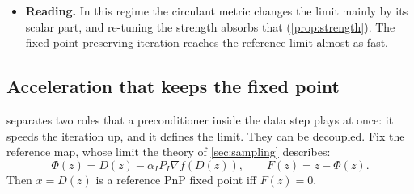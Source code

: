 \documentclass[11pt]{article}
\theoremstyle{definition}
\theoremstyle{remark}
\newcommand{\norm}[1]{\lVert #1\rVert}
\begin{document}
\begin{itemize}
  \begin{itemize}
  \item Per-set scalars: $\bar q/\alpha_I=1.77$ predicts $\lambda=2.2\cdot10^{-4}$ (grid best $2.5\cdot10^{-4}$). Non-scalar defect $0.42\,\bar q\norm{c_\parallel}$, leak $0$ (set-separable tangent). The displacement from $x_I$ drops from $1.0\cdot10^{-2}$ at the common strength to $5.2\cdot10^{-3}$.
  \item Shared circulant: $\bar q/\alpha_I=5.87$ predicts $\lambda=7.3\cdot10^{-4}$ (grid best $10^{-3}$). Non-scalar defect $0.41\,\bar q\norm{c_\parallel}$, leak $0.10\,\bar q\norm{c_\parallel}$. The displacement drops from $3.1\cdot10^{-2}$ to $5.1\cdot10^{-3}$ [measured].
  \end{itemize}
\item \textbf{Reading.} In this regime the circulant metric changes the limit mainly by its scalar part, and re-tuning the strength absorbs that (\cref{prop:strength}). The fixed-point-preserving iteration reaches the reference limit almost as fast.
\end{itemize}

\subsection{Acceleration that keeps the fixed point}\label{sec:keepfp}

 separates two roles that a preconditioner inside the data step plays at once: it speeds the
iteration up, and it defines the limit. They can be decoupled. Fix the reference map, whose limit the theory of
\cref{sec:sampling} describes:
\[
\Phi(z)=D(z)-\alpha_IP_I\nabla f(D(z)),\qquad F(z)=z-\Phi(z).
\]
Then $x=D(z)$ is a reference PnP fixed point iff $F(z)=0$.
\end{document}
